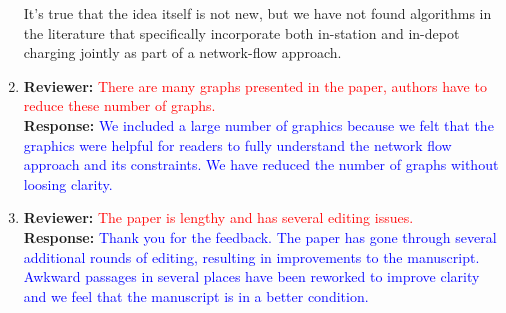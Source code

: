\documentclass{article}
\newcommand\formatfeedback[2]
{%
	\textbf{Reviewer:} \textcolor{red}{#1} 
	\\[0.1in] \textbf{Response:} \textcolor{blue}{#2}
}
\begin{document}
\begin{enumerate}
			     {It's true that the idea itself is not new, but we have not found algorithms in the literature that specifically incorporate both in-station and in-depot charging jointly as part of a network-flow approach.} 
	\item \formatfeedback{There are many graphs presented in the paper, authors have to reduce these number of graphs.}%
			     {We included a large number of graphics because we felt that the graphics were helpful for readers to fully understand the network flow approach and its constraints. We have reduced the number of graphs without loosing clarity.} 
	\item \formatfeedback{The paper is lengthy and has several editing issues.}%
			     {Thank you for the feedback. The paper has gone through several additional rounds of editing, resulting in improvements to the manuscript.  Awkward passages in several places have been reworked to improve clarity and we feel that the manuscript is in a better condition.} 
\end{enumerate}
\end{document}
